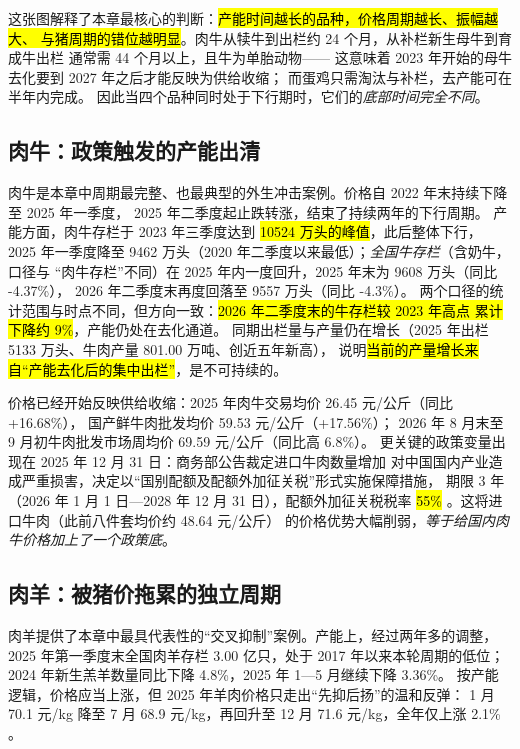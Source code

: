 这张图解释了本章最核心的判断：\hl{产能时间越长的品种，价格周期越长、振幅越大、
与猪周期的错位越明显}。肉牛从犊牛到出栏约 24 个月，从补栏新生母牛到育成牛出栏
通常需 44 个月以上，且牛为单胎动物\cite{ndrc2026beef}——
这意味着 2023 年开始的母牛去化要到 2027 年之后才能反映为供给收缩；
而蛋鸡只需淘汰与补栏，去产能可在半年内完成。
因此当四个品种同时处于下行期时，它们的\emph{底部时间完全不同}。

\subsection{肉牛：政策触发的产能出清}
\label{sec:other-beef}

肉牛是本章中周期最完整、也最典型的外生冲击案例。价格自 2022 年末持续下降至 2025 年一季度，
2025 年二季度起止跌转涨，结束了持续两年的下行周期\cite{ndrc2026beef}。
产能方面，肉牛存栏于 2023 年三季度达到 \hl{10524 万头的峰值}，此后整体下行，
2025 年一季度降至 9462 万头（2020 年二季度以来最低）；\emph{全国牛存栏}（含奶牛，口径与
“肉牛存栏”不同）在 2025 年内一度回升，2025 年末为 9608 万头（同比 -4.37\%），
2026 年二季度末再度回落至 9557 万头（同比 -4.3\%）\cite{ndrc2026beef,caas2026agri}。
两个口径的统计范围与时点不同，但方向一致：\hl{2026 年二季度末的牛存栏较 2023 年高点
累计下降约 9\%}，产能仍处在去化通道。
同期出栏量与产量仍在增长（2025 年出栏 5133 万头、牛肉产量 801.00 万吨、创近五年新高），
说明\hl{当前的产量增长来自“产能去化后的集中出栏”}，是不可持续的。

价格已经开始反映供给收缩：2025 年肉牛交易均价 26.45 元/公斤（同比 +16.68\%），
国产鲜牛肉批发均价 59.53 元/公斤（+17.56\%）\cite{caas2026agri}；
2026 年 8 月末至 9 月初牛肉批发市场周均价 69.59 元/公斤（同比高 6.8\%）\cite{xinhua2026week}。
更关键的政策变量出现在 2025 年 12 月 31 日：商务部公告裁定进口牛肉数量增加
对中国国内产业造成严重损害，决定以“国别配额及配额外加征关税”形式实施保障措施，
期限 3 年（2026 年 1 月 1 日---2028 年 12 月 31 日），配额外加征关税税率 \hl{55\%}
\cite{mofcom2026beef}。这将进口牛肉（此前八件套均价约 48.64 元/公斤）
的价格优势大幅削弱，\emph{等于给国内肉牛价格加上了一个政策底}。

\subsection{肉羊：被猪价拖累的独立周期}
\label{sec:other-mutton}

肉羊提供了本章中最具代表性的“交叉抑制”案例。产能上，经过两年多的调整，
2025 年第一季度末全国肉羊存栏 3.00 亿只，处于 2017 年以来本轮周期的低位；
2024 年新生羔羊数量同比下降 4.8\%，2025 年 1---5 月继续下降 3.36\%\cite{lj2026mutton}。
按产能逻辑，价格应当上涨，但 2025 年羊肉价格只走出“先抑后扬”的温和反弹：
1 月 70.1 元/kg 降至 7 月 68.9 元/kg，再回升至 12 月 71.6 元/kg，全年仅上涨 2.1\%
\cite{lj2026mutton}。


